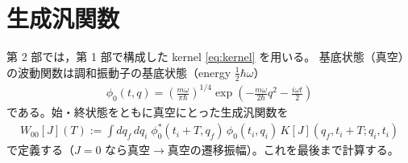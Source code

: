 \documentclass[dvipdfmx, uplatex]{jsarticle}
\theoremstyle{definition}
\begin{document}
\section{生成汎関数}
第 2 部では，第 1 部で構成した kernel \eqref{eq:kernel} を用いる。
基底状態（真空）の波動関数は調和振動子の基底状態（energy $\tfrac12\hbar\omega$）
\begin{align}
    \phi_0(t,q)
    =\left(\frac{m\omega}{\pi\hbar}\right)^{1/4}
    \exp\!\left(-\frac{m\omega}{2\hbar}q^2-\frac{i\omega t}{2}\right)
\label{eq:vac}
\end{align}
である。始・終状態をともに真空にとった生成汎関数を
\begin{align}
    W_{00}[J](T)
    :=\int dq_f\,dq_i\;\phi_0^*(t_i+T,q_f)\,\phi_0(t_i,q_i)\,K[J](q_f,t_i+T;q_i,t_i)
\label{eq:Wdef}
\end{align}
で定義する（$J=0$ なら真空$\to$真空の遷移振幅）。これを最後まで計算する。
\end{document}
